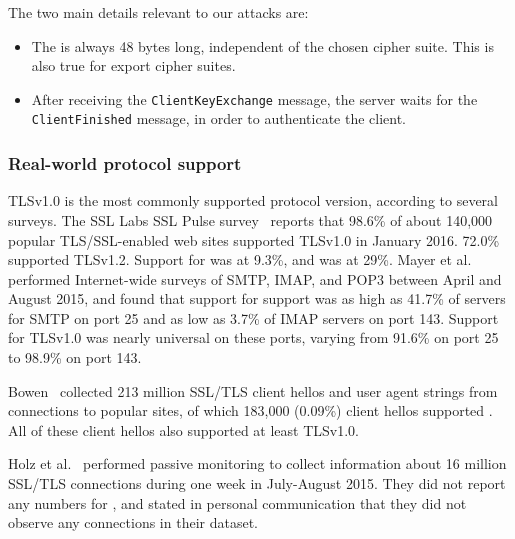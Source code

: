 The two main details relevant to our attacks are:
\begin{itemize}
	\item The \pms is always 48 bytes long, independent of the chosen cipher suite.  This is also true for export cipher suites.
	\item After receiving the \texttt{ClientKeyExchange} message, the server waits for the \texttt{ClientFinished} message, in order to authenticate the client.
\end{itemize}


\ifsubmit\relax\else
\subsubsection{Real-world protocol support}
TLSv1.0 is the most commonly supported protocol version, according to several surveys.  The SSL Labs SSL Pulse survey~\cite{ssllabs} reports that 98.6\% of about 140,000 popular TLS/SSL-enabled web sites supported TLSv1.0 in January 2016.  72.0\% supported TLSv1.2.  Support for \ssltwo was at 9.3\%, and \sslthree was at 29\%. Mayer et al.~\cite{DBLP:journals/corr/MayerZSH15} performed Internet-wide surveys of SMTP, IMAP, and POP3 between April and August 2015, and found that support for \ssltwo support was as high as 41.7\% of servers for SMTP on port 25 and as low as 3.7\% of IMAP servers on port 143.  Support for TLSv1.0 was nearly universal on these ports, varying from 91.6\% on port 25 to 98.9\% on port 143.

Bowen~\cite{bowencab} collected 213 million SSL/TLS client hellos and user agent strings from connections to popular sites, of which 183,000 (0.09\%) client hellos supported \ssltwo.  All of these client hellos also supported at least TLSv1.0.

Holz et al.~\cite{2016holz_analysis_tls-based_protocols_electronic_communication} performed passive monitoring to collect information about 16 million SSL/TLS connections during one week in July-August 2015.  They did not report any numbers for \ssltwo, and stated in personal communication that they did not observe any \ssltwo connections in their dataset.
\fi






